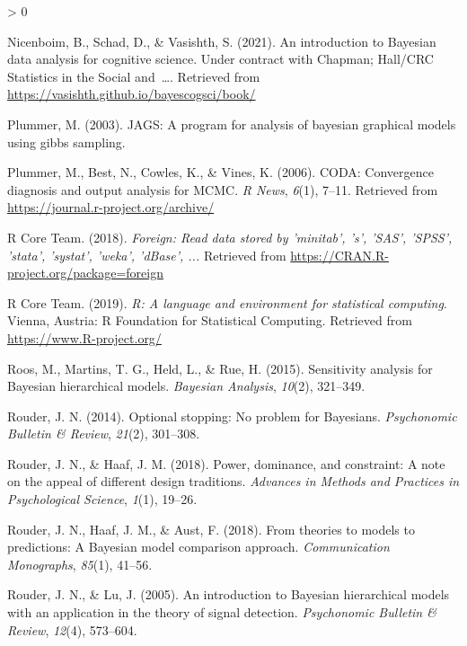 \documentclass[
  english,
  doc,floatsintext]{apa6}
\newlength{\cslhangindent}
\newenvironment{CSLReferences}[2] %
 {%
  \setlength{\parindent}{0pt}
  \ifodd #1 \everypar{\setlength{\hangindent}{\cslhangindent}}\ignorespaces\fi
  \ifnum #2 > 0
  \setlength{\parskip}{#2\baselineskip}
  \fi
 }%
 {}
\begin{document}
\begin{CSLReferences}{1}{0}
\leavevmode\hypertarget{ref-nicenboim2021introduction}{}%
Nicenboim, B., Schad, D., \& Vasishth, S. (2021). An introduction to {Bayesian} data analysis for cognitive science. Under contract with Chapman; Hall/CRC Statistics in the Social and~\ldots. Retrieved from \url{https://vasishth.github.io/bayescogsci/book/}

\leavevmode\hypertarget{ref-Plummer03jagsa}{}%
Plummer, M. (2003). JAGS: A program for analysis of bayesian graphical models using gibbs sampling.

\leavevmode\hypertarget{ref-R-coda}{}%
Plummer, M., Best, N., Cowles, K., \& Vines, K. (2006). CODA: Convergence diagnosis and output analysis for MCMC. \emph{R News}, \emph{6}(1), 7--11. Retrieved from \url{https://journal.r-project.org/archive/}

\leavevmode\hypertarget{ref-R-foreign}{}%
R Core Team. (2018). \emph{Foreign: Read data stored by 'minitab', 's', 'SAS', 'SPSS', 'stata', 'systat', 'weka', 'dBase', ...} Retrieved from \url{https://CRAN.R-project.org/package=foreign}

\leavevmode\hypertarget{ref-R-base}{}%
R Core Team. (2019). \emph{R: A language and environment for statistical computing}. Vienna, Austria: R Foundation for Statistical Computing. Retrieved from \url{https://www.R-project.org/}

\leavevmode\hypertarget{ref-roos2015sensitivity}{}%
Roos, M., Martins, T. G., Held, L., \& Rue, H. (2015). Sensitivity analysis for {Bayesian} hierarchical models. \emph{Bayesian Analysis}, \emph{10}(2), 321--349.

\leavevmode\hypertarget{ref-rouder2014optional}{}%
Rouder, J. N. (2014). Optional stopping: No problem for {Bayesians}. \emph{Psychonomic Bulletin \& Review}, \emph{21}(2), 301--308.

\leavevmode\hypertarget{ref-rouder2018power}{}%
Rouder, J. N., \& Haaf, J. M. (2018). Power, dominance, and constraint: A note on the appeal of different design traditions. \emph{Advances in Methods and Practices in Psychological Science}, \emph{1}(1), 19--26.

\leavevmode\hypertarget{ref-rouder2018theories}{}%
Rouder, J. N., Haaf, J. M., \& Aust, F. (2018). From theories to models to predictions: A {Bayesian} model comparison approach. \emph{Communication Monographs}, \emph{85}(1), 41--56.

\leavevmode\hypertarget{ref-rouder2005introduction}{}%
Rouder, J. N., \& Lu, J. (2005). An introduction to {Bayesian} hierarchical models with an application in the theory of signal detection. \emph{Psychonomic Bulletin \& Review}, \emph{12}(4), 573--604.


\end{CSLReferences}
\end{document}
